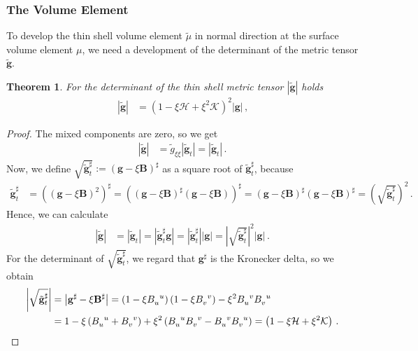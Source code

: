 \documentclass[a4paper,10pt]{scrartcl}
\newcommand{\gb}{\mathbf{g}}
\newcommand{\tgb}{\tilde{\gb}}
\newcommand{\tg}{\tilde{g}}
\newcommand{\Bb}{\mathbf{B}}
\newcommand{\meanc}{\mathcal{H}}
\newcommand{\gaussc}{\mathcal{K}}
\newcommand{\formComma}{\,\text{,}}
\newcommand{\formPeriod}{\,\text{.}}
\newtheorem{theorem}{Theorem}
\begin{document}
\subsubsection{The Volume Element}
  To develop the thin shell volume element \( \tilde{\mu} \) in normal direction at the surface volume element \( \mu \), 
  we need a development of the determinant of the metric tensor \( \tgb \).
  \begin{theorem}
    For the determinant of the thin shell metric tensor \( \left| \tgb \right| \) holds
    \begin{align}
       \left| \tgb \right| &= \left( 1 - \xi\meanc + \xi^{2}\gaussc \right)^{2}\left| \gb \right|\formComma
    \end{align}
  \end{theorem}
  \begin{proof}
    The mixed components are zero, so we get
    \begin{align}
      \left| \tgb \right| &= \tg_{\xi\xi}\left| \tgb_{t} \right| = \left| \tgb_{t} \right|\formPeriod
    \end{align}
    Now, we define \( \sqrt{\tgb_{t}^{\sharp}}   := \left(\gb - \xi \Bb\right)^{\sharp} \) as a square root of \( \tgb_{t}^{\sharp} \),
    because
    \begin{align}
      \tgb_{t}^{\sharp} &= \left( \left( \gb -\xi\Bb \right)^{2} \right)^{\sharp}
              = \left( \left( \gb -\xi\Bb \right)^{\sharp}\left( \gb -\xi\Bb \right)  \right)^{\sharp}
              = \left( \gb -\xi\Bb \right)^{\sharp}\left( \gb -\xi\Bb \right)^{\sharp} 
              = \left( \sqrt{\tgb_{t}^{\sharp}} \right)^{2} \formPeriod
    \end{align}
    Hence, we can calculate
    \begin{align}
      \left| \tgb \right| &= \left| \tgb_{t} \right| = \left| \tgb_{t}^{\sharp}\gb \right|
                    =\left| \tgb_{t}^{\sharp} \right| \left| \gb \right|
                    =\left| \sqrt{\tgb_{t}^{\sharp}} \right|^{2} \left| \gb \right| \formPeriod
    \end{align}
    For the determinant of \( \sqrt{\tgb_{t}^{\sharp}} \), we regard that \( \gb^{\sharp} \) is the Kronecker delta,
    so we obtain
    \begin{align}
       \left| \sqrt{\tgb_{t}^{\sharp}} \right| 
            &= \left| \gb^{\sharp} - \xi\Bb^{\sharp} \right|
             = \left( 1 - \xi\tensor{B}{_{u}^{u}} \right)\left( 1 - \xi\tensor{B}{_{v}^{v}} \right)
                  - \xi^{2}\tensor{B}{_{u}^{v}}\tensor{B}{_{v}^{u}} \\
            &= 1 - \xi\left( \tensor{B}{_{u}^{u}} + \tensor{B}{_{v}^{v}} \right) 
                  + \xi^{2}\left( \tensor{B}{_{u}^{u}} \tensor{B}{_{v}^{v}} - \tensor{B}{_{u}^{v}}\tensor{B}{_{v}^{u}} \right)
             =\left( 1 - \xi\meanc + \xi^{2}\gaussc \right) \formPeriod
    \end{align}
  \end{proof}
\end{document}
